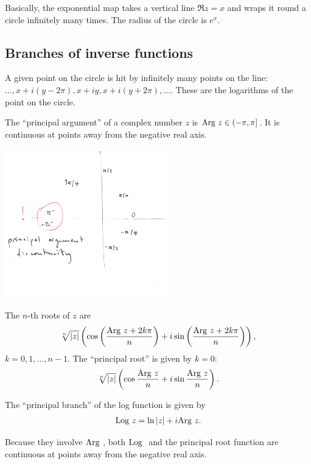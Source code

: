 \documentclass[12pt]{article}
\begin{document}
Basically, the exponential map takes a vertical line $\Re z = x$ and wraps it
round a circle infinitely many times. The radius of the circle is $e^x$.

\subsection*{Branches of inverse functions}

A given point on the circle is hit by infinitely many points on the line:
$\ldots, x + i(y - 2\pi), x + iy, x + i(y + 2\pi), \ldots.$ These are the
logarithms of the point on the circle.


The ``principal argument'' of a complex number $z$ is $\text{Arg}~ z \in (-\pi,
\pi]$. It is continuous at points away from the negative real axis.

\includegraphics[width=200pt]{img/principal-arg.png}

The $n$-th roots of $z$ are
\begin{align*}
  \sqrt[n] {|z|}\left(\cos\left(\frac{\text{Arg}~ z + 2k\pi}{n}\right) + i\sin\left(\frac{\text{Arg}~ z + 2k\pi}{n}\right)\right),
\end{align*}
$k = 0, 1, \ldots, n-1$.
The ``principal root'' is given by $k = 0$:
\begin{align*}
  \sqrt[n] {|z|}\left(\cos\frac{\text{Arg}~ z}{n} + i\sin\frac{\text{Arg}~ z}{n}\right).
\end{align*}

The ``principal branch'' of the log function is given by
\begin{align*}
  \text{Log}~ z = \ln |z| + i\text{Arg}~ z.
\end{align*}

Because they involve $\text{Arg}~$, both $\text{Log}~$ and the principal root function are
continuous at points away from the negative real axis.
\end{document}
